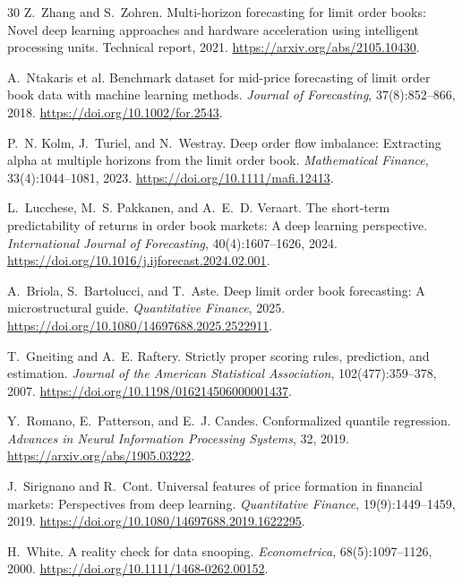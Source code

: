 \documentclass[10pt,letterpaper]{article}
\numberwithin{equation}{section}
\theoremstyle{definition}
\theoremstyle{remark}
\begin{document}
\begin{thebibliography}{30}
Z.~Zhang and S.~Zohren.
\newblock Multi-horizon forecasting for limit order books: Novel deep learning
approaches and hardware acceleration using intelligent processing units.
\newblock Technical report, 2021.
\newblock \url{https://arxiv.org/abs/2105.10430}.

A.~Ntakaris et al.
\newblock Benchmark dataset for mid-price forecasting of limit order book data
with machine learning methods.
\newblock \emph{Journal of Forecasting}, 37(8):852--866, 2018.
\newblock \url{https://doi.org/10.1002/for.2543}.

P.~N. Kolm, J.~Turiel, and N.~Westray.
\newblock Deep order flow imbalance: Extracting alpha at multiple horizons from
the limit order book.
\newblock \emph{Mathematical Finance}, 33(4):1044--1081, 2023.
\newblock \url{https://doi.org/10.1111/mafi.12413}.

L.~Lucchese, M.~S. Pakkanen, and A.~E.~D. Veraart.
\newblock The short-term predictability of returns in order book markets: A
deep learning perspective.
\newblock \emph{International Journal of Forecasting}, 40(4):1607--1626, 2024.
\newblock \url{https://doi.org/10.1016/j.ijforecast.2024.02.001}.

A.~Briola, S.~Bartolucci, and T.~Aste.
\newblock Deep limit order book forecasting: A microstructural guide.
\newblock \emph{Quantitative Finance}, 2025.
\newblock \url{https://doi.org/10.1080/14697688.2025.2522911}.

T.~Gneiting and A.~E. Raftery.
\newblock Strictly proper scoring rules, prediction, and estimation.
\newblock \emph{Journal of the American Statistical Association},
102(477):359--378, 2007.
\newblock \url{https://doi.org/10.1198/016214506000001437}.

Y.~Romano, E.~Patterson, and E.~J. Candes.
\newblock Conformalized quantile regression.
\newblock \emph{Advances in Neural Information Processing Systems}, 32, 2019.
\newblock \url{https://arxiv.org/abs/1905.03222}.

J.~Sirignano and R.~Cont.
\newblock Universal features of price formation in financial markets:
Perspectives from deep learning.
\newblock \emph{Quantitative Finance}, 19(9):1449--1459, 2019.
\newblock \url{https://doi.org/10.1080/14697688.2019.1622295}.

H.~White.
\newblock A reality check for data snooping.
\newblock \emph{Econometrica}, 68(5):1097--1126, 2000.
\newblock \url{https://doi.org/10.1111/1468-0262.00152}.


\end{thebibliography}
\end{document}
